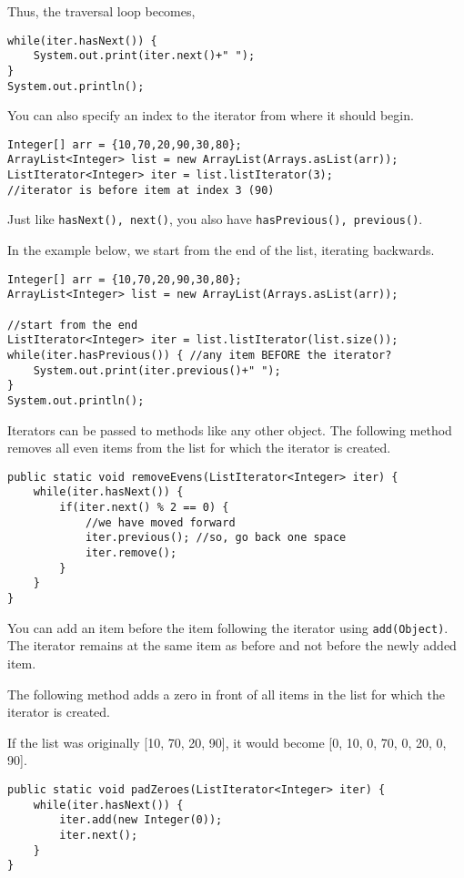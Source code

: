 Thus, the traversal loop becomes,

\begin{lstlisting}
while(iter.hasNext()) {
	System.out.print(iter.next()+" ");
}
System.out.println();
\end{lstlisting}

You can also specify an index to the iterator from where it should begin.

\begin{lstlisting}
Integer[] arr = {10,70,20,90,30,80};
ArrayList<Integer> list = new ArrayList(Arrays.asList(arr));
ListIterator<Integer> iter = list.listIterator(3); 
//iterator is before item at index 3 (90)
\end{lstlisting}

Just like \texttt{hasNext(), next()}, you also have \texttt{hasPrevious(), previous()}.

In the example below, we start from the end of the list, iterating backwards.

\begin{lstlisting}
Integer[] arr = {10,70,20,90,30,80};
ArrayList<Integer> list = new ArrayList(Arrays.asList(arr));

//start from the end
ListIterator<Integer> iter = list.listIterator(list.size());
while(iter.hasPrevious()) { //any item BEFORE the iterator?
	System.out.print(iter.previous()+" ");
}
System.out.println();
\end{lstlisting}

Iterators can be passed to methods like any other object.
The following method removes all even items from the list for which the iterator is created.

\begin{lstlisting}
public static void removeEvens(ListIterator<Integer> iter) {
	while(iter.hasNext()) {
		if(iter.next() % 2 == 0) {
			//we have moved forward
			iter.previous(); //so, go back one space
			iter.remove(); 
		}
	}
}
\end{lstlisting}

You can add an item before the item following the iterator using \texttt{add(Object)}. The iterator remains at the same item as before and not before the newly added item.

The following method adds a zero in front of all items in the list for which the iterator is created. 

If the list was originally [10, 70, 20, 90], it would become [0, 10, 0, 70, 0, 20, 0, 90].

\begin{lstlisting}
public static void padZeroes(ListIterator<Integer> iter) {
	while(iter.hasNext()) {
		iter.add(new Integer(0)); 
		iter.next();
	}
}
\end{lstlisting}


